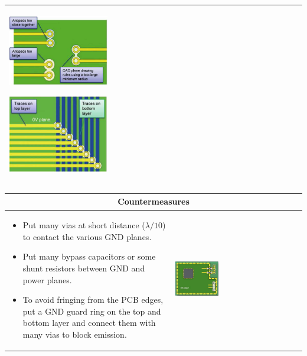 \begin{table}[h!]
\begin{tabular}{|m{}|m{}|}
				 \begin{center}\includegraphics[width=0.35\textwidth]{images/BadAntipads.png}\end{center} 
				 \begin{center}\includegraphics[width=0.35\textwidth]{images/Traces.png}\end{center} 
			\\
			\hline
			\end{tabular}
		\end{table}	

		
		\begin{table}[h!]
		\centering
		\begin{tabular}{|m{}|m{}|}

				\multicolumn{2}{c}{\textbf{Countermeasures}}
			\\
			\hline
				\begin{itemize}
					\item Put many vias at short distance ($\lambda/10$) to contact the various GND planes. 
					\item Put many bypass capacitors or some shunt resistors between GND and power planes. 
					\item To avoid fringing from the PCB edges, put a GND guard ring on the top and bottom layer and connect them with many vias to block emission. 
				\end{itemize}
			& 
				 \begin{center}\includegraphics[width=0.35\textwidth]{images/GNDGuard.png}\end{center}  		
			\\
			\hline
			\end{tabular}
		\end{table}	